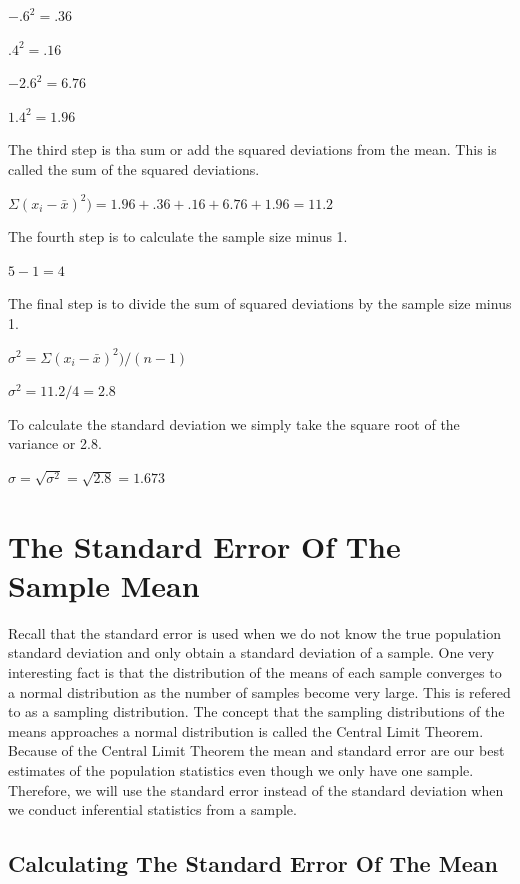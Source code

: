\documentclass[]{book}
\theoremstyle{definition}
\theoremstyle{definition}
\theoremstyle{definition}
\theoremstyle{remark}
\begin{document}
\(-.6^2 = .36\)

\(.4^2 = .16\)

\(-2.6^2 = 6.76\)

\(1.4^2 = 1.96\)

The third step is tha sum or add the squared deviations from the mean.
This is called the sum of the squared deviations.

\(\Sigma(x_{i} - \bar{x})^2) = 1.96 + .36 + .16 + 6.76 + 1.96 = 11.2\)

The fourth step is to calculate the sample size minus 1.

\(5 - 1 = 4\)

The final step is to divide the sum of squared deviations by the sample
size minus 1.

\(\sigma^2 = \Sigma(x_{i} - \bar{x})^2)/(n-1)\)

\(\sigma^2 = 11.2/4 = 2.8\)

To calculate the standard deviation we simply take the square root of
the variance or 2.8.

\(\sigma = \sqrt{\sigma^2} = \sqrt{2.8} =1.673\)

\hypertarget{the-standard-error-of-the-sample-mean}{%
\section{The Standard Error Of The Sample
Mean}\label{the-standard-error-of-the-sample-mean}}

Recall that the standard error is used when we do not know the true
population standard deviation and only obtain a standard deviation of a
sample. One very interesting fact is that the distribution of the means
of each sample converges to a normal distribution as the number of
samples become very large. This is refered to as a sampling
distribution. The concept that the sampling distributions of the means
approaches a normal distribution is called the Central Limit Theorem.
Because of the Central Limit Theorem the mean and standard error are our
best estimates of the population statistics even though we only have one
sample. Therefore, we will use the standard error instead of the
standard deviation when we conduct inferential statistics from a sample.

\hypertarget{calculating-the-standard-error-of-the-mean}{%
\subsection{Calculating The Standard Error Of The
Mean}\label{calculating-the-standard-error-of-the-mean}}
\end{document}
